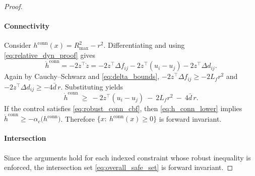 \begin{proof}
\paragraph{Connectivity}
Consider $h^{\mathrm{conn}}(x)=R_{\max}^2-r^2$. Differentiating and using \eqref{eq:relative_dyn_proof} gives
\begin{equation}
\dot h^{\mathrm{conn}}
= -2 z^\top \dot z
= -2 z^\top \Delta f_{ij} - 2 z^\top (u_i-u_j) - 2 z^\top \Delta d_{ij}.
\label{eq:h_conn_dot}
\end{equation}
Again by Cauchy--Schwarz and \eqref{eq:delta_bounds},
$-2 z^\top \Delta f_{ij}\ge -2L_f r^2$ and $-2 z^\top \Delta d_{ij}\ge -4\bar d\,r$.
Substituting yields
\begin{equation}
\dot h^{\mathrm{conn}}
\ \ge\
-2 z^\top (u_i-u_j)\ -\ 2L_f r^2\ -\ 4\bar d\, r.
\label{eq:h_conn_lower}
\end{equation}
If the control satisfies \eqref{eq:robust_conn_cbf}, then \eqref{eq:h_conn_lower} implies
$\dot h^{\mathrm{conn}} \ge -\alpha_c\big(h^{\mathrm{conn}}\big)$.
Therefore $\{x:\ h^{\mathrm{conn}}(x)\ge 0\}$ is forward invariant.

\paragraph{Intersection}
Since the arguments hold for each indexed constraint whose robust inequality is enforced, the intersection set \eqref{eq:overall_safe_set} is forward invariant.
\end{proof}

